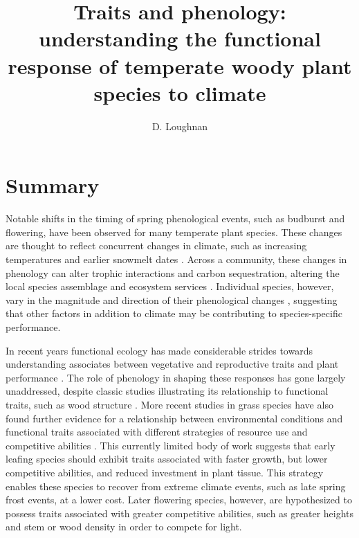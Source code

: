 \documentclass[11pt,a4paper,oneside]{article}
\title{Traits and phenology: understanding the functional response of temperate woody plant species to climate} %
\author{D. Loughnan}
\begin{document}
% 

\maketitle
 
\section*{Summary}
\par Notable shifts in the timing of spring phenological events, such as budburst and flowering, have been observed for many temperate plant species. These changes are thought to reflect concurrent changes in climate, such as increasing temperatures and earlier snowmelt dates \cite{Anderson2012}. Across a community, these changes in phenology can alter trophic interactions and carbon sequestration, altering the local species assemblage and ecosystem services \cite{Kharouba2018,Cleland:2007}. Individual species, however, vary in the magnitude and direction of their phenological changes \cite{Fitter2002,Dunnell2011,Konig2018}, suggesting that other factors in addition to climate may be contributing to species-specific performance.

\par In recent years functional ecology has made considerable strides towards understanding associates between vegetative and reproductive traits and plant performance \cite{McGill2006}.  The role of phenology in shaping these responses has gone largely unaddressed, despite classic studies illustrating its relationship to functional traits, such as wood structure \cite{Lechowich1984}. More recent studies in grass species have also found further evidence for a relationship between environmental conditions and functional traits associated with different strategies of resource use and competitive abilities \cite{Konig2018; Sun2011}. This currently limited body of work suggests that early leafing species should exhibit traits associated with faster growth, but lower competitive abilities, and reduced investment in plant tissue. This strategy enables these species to recover from extreme climate events, such as late spring frost events, at a lower cost. Later flowering species, however, are hypothesized to possess traits associated with greater competitive abilities, such as greater heights and stem or wood density in order to compete for light. 
\end{document}
